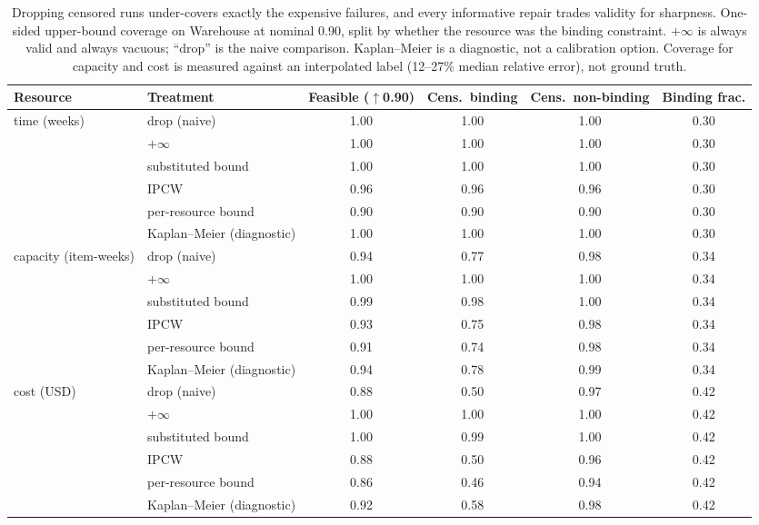 \documentclass{article}
\begin{document}
\begin{table}[t]
\centering
\caption{Dropping censored runs under-covers exactly the expensive failures, and every informative repair trades validity for sharpness. One-sided upper-bound coverage on Warehouse at nominal 0.90, split by whether the resource was the binding constraint. $+\infty$ is always valid and always vacuous; ``drop'' is the naive comparison. Kaplan--Meier is a diagnostic, not a calibration option. Coverage for capacity and cost is measured against an interpolated label (12--27\% median relative error), not ground truth.}
\label{tab:censored}
\footnotesize
\setlength{\tabcolsep}{4pt}
\begin{tabular}{@{}llcccc@{}}
\toprule
Resource & Treatment & Feasible ($\uparrow$0.90) & Cens.\ binding & Cens.\ non-binding & Binding frac. \\
\midrule
\multirow{6}{*}{time (weeks)}
 & drop (naive) & 1.00 & 1.00 & 1.00 & 0.30 \\
 & $+\infty$ & 1.00 & 1.00 & 1.00 & 0.30 \\
 & substituted bound & 1.00 & 1.00 & 1.00 & 0.30 \\
 & IPCW & 0.96 & 0.96 & 0.96 & 0.30 \\
 & per-resource bound & 0.90 & 0.90 & 0.90 & 0.30 \\
 & Kaplan--Meier (diagnostic) & 1.00 & 1.00 & 1.00 & 0.30 \\
\midrule
\multirow{6}{*}{capacity (item-weeks)}
 & drop (naive) & 0.94 & 0.77 & 0.98 & 0.34 \\
 & $+\infty$ & 1.00 & 1.00 & 1.00 & 0.34 \\
 & substituted bound & 0.99 & 0.98 & 1.00 & 0.34 \\
 & IPCW & 0.93 & 0.75 & 0.98 & 0.34 \\
 & per-resource bound & 0.91 & 0.74 & 0.98 & 0.34 \\
 & Kaplan--Meier (diagnostic) & 0.94 & 0.78 & 0.99 & 0.34 \\
\midrule
\multirow{6}{*}{cost (USD)}
 & drop (naive) & 0.88 & 0.50 & 0.97 & 0.42 \\
 & $+\infty$ & 1.00 & 1.00 & 1.00 & 0.42 \\
 & substituted bound & 1.00 & 0.99 & 1.00 & 0.42 \\
 & IPCW & 0.88 & 0.50 & 0.96 & 0.42 \\
 & per-resource bound & 0.86 & 0.46 & 0.94 & 0.42 \\
 & Kaplan--Meier (diagnostic) & 0.92 & 0.58 & 0.98 & 0.42 \\
\bottomrule
\end{tabular}
\end{table}
\end{document}
